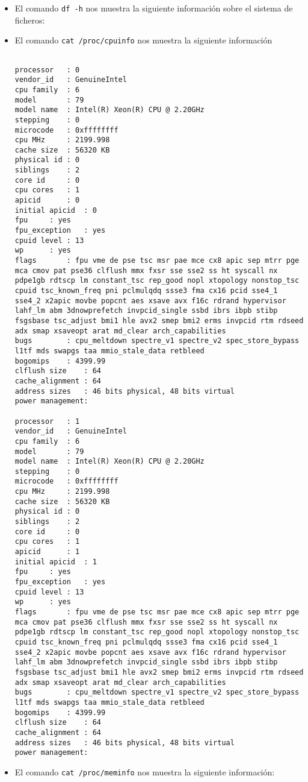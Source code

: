 \begin{enumerate}
\begin{itemize}
                \begin{itemize}
                    \item El comando \lstinline{df -h} nos muestra la siguiente información sobre el sistema de ficheros:
                    \item El comando \lstinline{cat /proc/cpuinfo} nos muestra la siguiente información
                        \begin{lstlisting}

processor	: 0
vendor_id	: GenuineIntel
cpu family	: 6
model		: 79
model name	: Intel(R) Xeon(R) CPU @ 2.20GHz
stepping	: 0
microcode	: 0xffffffff
cpu MHz		: 2199.998
cache size	: 56320 KB
physical id	: 0
siblings	: 2
core id		: 0
cpu cores	: 1
apicid		: 0
initial apicid	: 0
fpu		: yes
fpu_exception	: yes
cpuid level	: 13
wp		: yes
flags		: fpu vme de pse tsc msr pae mce cx8 apic sep mtrr pge mca cmov pat pse36 clflush mmx fxsr sse sse2 ss ht syscall nx pdpe1gb rdtscp lm constant_tsc rep_good nopl xtopology nonstop_tsc cpuid tsc_known_freq pni pclmulqdq ssse3 fma cx16 pcid sse4_1 sse4_2 x2apic movbe popcnt aes xsave avx f16c rdrand hypervisor lahf_lm abm 3dnowprefetch invpcid_single ssbd ibrs ibpb stibp fsgsbase tsc_adjust bmi1 hle avx2 smep bmi2 erms invpcid rtm rdseed adx smap xsaveopt arat md_clear arch_capabilities
bugs		: cpu_meltdown spectre_v1 spectre_v2 spec_store_bypass l1tf mds swapgs taa mmio_stale_data retbleed
bogomips	: 4399.99
clflush size	: 64
cache_alignment	: 64
address sizes	: 46 bits physical, 48 bits virtual
power management:

processor	: 1
vendor_id	: GenuineIntel
cpu family	: 6
model		: 79
model name	: Intel(R) Xeon(R) CPU @ 2.20GHz
stepping	: 0
microcode	: 0xffffffff
cpu MHz		: 2199.998
cache size	: 56320 KB
physical id	: 0
siblings	: 2
core id		: 0
cpu cores	: 1
apicid		: 1
initial apicid	: 1
fpu		: yes
fpu_exception	: yes
cpuid level	: 13
wp		: yes
flags		: fpu vme de pse tsc msr pae mce cx8 apic sep mtrr pge mca cmov pat pse36 clflush mmx fxsr sse sse2 ss ht syscall nx pdpe1gb rdtscp lm constant_tsc rep_good nopl xtopology nonstop_tsc cpuid tsc_known_freq pni pclmulqdq ssse3 fma cx16 pcid sse4_1 sse4_2 x2apic movbe popcnt aes xsave avx f16c rdrand hypervisor lahf_lm abm 3dnowprefetch invpcid_single ssbd ibrs ibpb stibp fsgsbase tsc_adjust bmi1 hle avx2 smep bmi2 erms invpcid rtm rdseed adx smap xsaveopt arat md_clear arch_capabilities
bugs		: cpu_meltdown spectre_v1 spectre_v2 spec_store_bypass l1tf mds swapgs taa mmio_stale_data retbleed
bogomips	: 4399.99
clflush size	: 64
cache_alignment	: 64
address sizes	: 46 bits physical, 48 bits virtual
power management:
                        \end{lstlisting}
                    \item El comando \lstinline{cat /proc/meminfo} nos muestra la siguiente información:



\end{itemize}
\end{itemize}
\end{enumerate}
